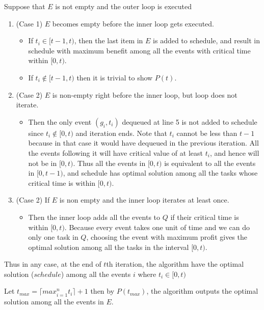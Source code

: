     Suppose that $E$ is not empty and the outer loop is executed
    \begin{enumerate}[label=]
        \item (Case 1) $E$ becomes empty before the inner loop gets executed.
        \begin{itemize}[label=]
            \item If $t_i \in [t-1, t)$, then the last item in $E$ is added to schedule, 
            and result in schedule with maximum benefit 
            among all the events with critical time within $[0, t)$.
            \item If $t_i \notin [t-1, t)$ then it is trivial to show $P(t)$.
        \end{itemize}
        \item (Case 2) $E$ is non-empty right before the inner loop, but loop does not iterate.
        \begin{itemize}[label=]
            \item Then the only event $(g_i, t_i)$ dequeued at line 5 is not added to schedule since $t_i \notin [0, t)$ and iteration ends.
            Note that $t_i$ cannot be less than $t - 1$ because in that case it would have dequeued in the previous iteration.
            All the events following it will have critical value of at least $t_i$, and hence will not be in $[0, t)$. 
            Thus all the events in $[0, t)$ is equivalent to all the events in $[0, t-1)$, and schedule has optimal solution
            among all the tasks whose critical time is within $[0, t)$.
        \end{itemize}
        \item (Case 2) If $E$ is non empty and the inner loop iterates at least once.
        \begin{itemize}[label=]
            \item Then the inner loop adds all the events to $Q$ if their critical time is within $[0, t)$.
            Because every event takes one unit of time and we can do only one task in $Q$, choosing the event with
            maximum profit gives the optimal solution among all the tasks in the interval $[0, t)$.
        \end{itemize}
    \end{enumerate}

Thus in any case, at the end of $t$th iteration, the algorithm have the optimal solution ($schedule$) 
among all the events $i$ where $t_i \in [0, t)$

Let $t_{max} = \lceil max_{i = 1}^n t_i \rceil + 1$ then by $P(t_{max})$, the algorithm outputs the optimal solution 
    among all the events in $E$.






